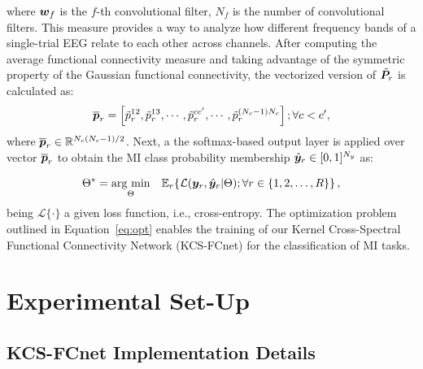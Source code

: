 {    where $\bm {w}_f$ is the $f$-th convolutional filter, $N_f$ is the number of convolutional filters. This measure provides a way to analyze how different frequency bands of a single-trial EEG relate to each other across channels. After computing the average functional connectivity measure and taking advantage of the symmetric property of the Gaussian functional connectivity, the vectorized version of $\tilde{\bm {P}}_r$ is calculated as:
    \begin{equation} 
        \overline{\bm {p}}_r = \left[\tilde{p}_r^{12}, \tilde{p}_r^{13}, \cdots, \tilde{p}_r^{cc'}, \cdots, \tilde{p}_r^{(N_c-1) N_c} \right]; \forall c<c',
    \end{equation}
    where $\overline{\bm {p}}_r \in  \mathbb{R} ^{N_c(N_c-1)/2}$. Next, a the softmax-based output layer is applied over vector $\overline{\bm {p}}_r$ to obtain the MI class probability membership $\hat{\bm {y}}_r \in [0,1]^{N_y}$ as:
    }  
    
	\begin{equation}\label{eq:opt}
		\Theta^{*} = \underset{\Theta}{\arg\,\min} \quad \mathbb{E}_{r}\!\left\{\mathcal{L}(\bm {y}_r,\hat{\bm {y}}_r|\Theta); \forall r\in\{1,2,\dots,R\}\right\},
	\end{equation}
	being $\mathcal{L} \{\cdot\}$ a given loss function, i.e., cross-entropy. The optimization problem outlined in Equation~\eqref{eq:opt} enables the training of our Kernel Cross-Spectral Functional Connectivity Network (KCS-FCnet) for the classification of MI tasks. 


\section{Experimental Set-Up} \label{sec:Experiment}

\subsection{KCS-FCnet Implementation Details}

